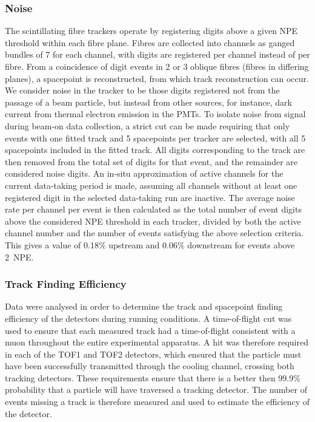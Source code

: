 \subsubsection{Noise}
The scintillating fibre trackers operate by registering digits above a given NPE threshold within each fibre plane. Fibres are collected into channels as ganged bundles of 7 for each channel, with digits are registered per channel instead of per fibre. From a coincidence of digit events in 2 or 3 oblique fibres (fibres in differing planes), a spacepoint is reconstructed, from which track reconstruction can occur. We consider noise in the tracker to be those digits registered not from the passage of a beam particle, but instead from other sources, for instance, dark current from thermal electron emission in the PMTs. To isolate noise from signal during beam-on data collection, a strict cut can be made requiring that only events with one fitted track and 5 spacepoints per tracker are selected, with all 5 spacepoints included in the fitted track. All digits corresponding to the track are then removed from the total set of digits for that event, and the remainder are considered noise digits. An in-situ approximation of active channels for the current data-taking period is made, assuming all channels without at least one registered digit in the selected data-taking run are inactive. The average noise rate per channel per event is then calculated as the total number of event digits above the considered NPE threshold in each tracker, divided by both the active channel number and the number of events satisfying the above selection criteria. This gives a value of 0.18\% upstream and 0.06\% downstream for events above 2~NPE. 

\subsubsection{Track Finding Efficiency}
\label{trackers:performance:efficiency}
Data were analysed in order to determine the track and spacepoint finding efficiency of the detectors during running conditions. A time-of-flight cut was used to ensure that each measured track had a time-of-flight consistent with a muon throughout the entire experimental apparatus. A hit was therefore required in each of the TOF1 and TOF2 detectors, which ensured that the particle must have been successfully transmitted through the cooling channel, crossing both tracking detectors. These requirements ensure that there is a better then 99.9\% probability that a particle will have traversed a tracking detector. The number of events missing a track is therefore measured and used to estimate the efficiency of the detector.

